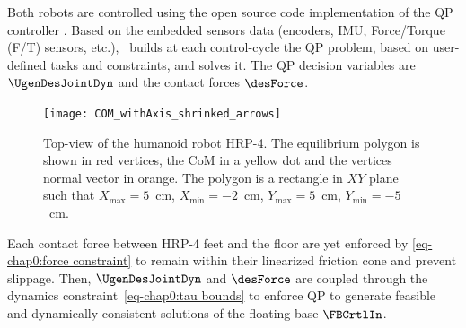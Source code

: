 Both robots are controlled using the open source code implementation of the QP controller \mcrtc. %
Based on the embedded sensors data (encoders, IMU, Force/Torque (F/T) sensors, etc.), \mcrtc~builds at each control-cycle the QP problem, based on user-defined tasks and constraints, and solves it. The QP decision variables are $\UgenDesJointDyn$ and the contact forces $\desForce$. 
\begin{figure}
	\centering
	\texttt{[image: COM\_withAxis\_shrinked\_arrows]}
	\caption{Top-view of the humanoid robot HRP-4. The equilibrium polygon is shown in red vertices, the CoM in a yellow dot and the vertices normal vector in orange. The polygon is a rectangle in ${XY}$ plane such that ${X}_{\max} = 5$~cm, ${X}_{\min} = -2$~cm, ${Y}_{\max} = 5$~cm, ${Y}_{\min} = -5$~cm.}
	\label{fig:CoM polgon}
\end{figure}
Each contact force between HRP-4 feet and the floor are yet enforced by \cref{eq-chap0:force constraint} to remain within their linearized friction cone and prevent slippage. %
Then, $\UgenDesJointDyn$ and $\desForce$ are coupled through the dynamics constraint~\eqref{eq-chap0:tau bounds} to enforce QP to generate feasible and dynamically-consistent solutions of the floating-base $\FBCrtlIn$.
